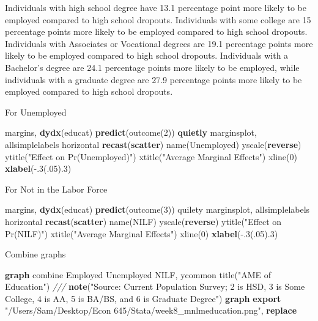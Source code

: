 \documentclass[
]{book}
\newenvironment{Shaded}{\begin{snugshade}}{\end{snugshade}}
\newcommand{\BaseNTok}[1]{\textcolor[rgb]{0.00,0.00,0.81}{#1}}
\newcommand{\CommentTok}[1]{\textcolor[rgb]{0.56,0.35,0.01}{\textit{#1}}}
\newcommand{\FunctionTok}[1]{\textcolor[rgb]{0.13,0.29,0.53}{\textbf{#1}}}
\newcommand{\KeywordTok}[1]{\textcolor[rgb]{0.13,0.29,0.53}{\textbf{#1}}}
\newcommand{\NormalTok}[1]{#1}
\newcommand{\StringTok}[1]{\textcolor[rgb]{0.31,0.60,0.02}{#1}}
\begin{document}
Individuals with high school degree have 13.1 percentage point more likely to be employed compared to high school dropouts. Individuals with some college are 15 percentage points more likely to be employed compared to high school dropouts. Individuals with Associates or Vocational degrees are 19.1 percentage points more likely to be employed compared to high school dropouts. Individuals with a Bachelor's degree are 24.1 percentage points more likely to be employed, while individuals with a graduate degree are 27.9 percentage points more likely to be employed compared to high school dropouts.

For Unemployed

\begin{Shaded}
\begin{Highlighting}[]
\NormalTok{margins, }\KeywordTok{dydx}\NormalTok{(educat) }\KeywordTok{predict}\NormalTok{(outcome(2))}
\KeywordTok{quietly}\NormalTok{ marginsplot, allsimplelabels horizontal }\KeywordTok{recast}\NormalTok{(}\KeywordTok{scatter}\NormalTok{) }\BaseNTok{name}\NormalTok{(Unemployed) }\BaseNTok{yscale}\NormalTok{(}\FunctionTok{reverse}\NormalTok{) }\BaseNTok{ytitle}\NormalTok{(}\StringTok{"Effect on Pr(Unemployed)"}\NormalTok{) }\BaseNTok{xtitle}\NormalTok{(}\StringTok{"Average Marginal Effects"}\NormalTok{) }\BaseNTok{xline}\NormalTok{(0) }\KeywordTok{xlabel}\NormalTok{({-}.3(.05).3)}
\end{Highlighting}
\end{Shaded}

For Not in the Labor Force

\begin{Shaded}
\begin{Highlighting}[]
\NormalTok{margins, }\KeywordTok{dydx}\NormalTok{(educat) }\KeywordTok{predict}\NormalTok{(outcome(3))}
\NormalTok{quilety marginsplot, allsimplelabels horizontal }\KeywordTok{recast}\NormalTok{(}\KeywordTok{scatter}\NormalTok{) }\BaseNTok{name}\NormalTok{(NILF) }\BaseNTok{yscale}\NormalTok{(}\FunctionTok{reverse}\NormalTok{) }\BaseNTok{ytitle}\NormalTok{(}\StringTok{"Effect on Pr(NILF)"}\NormalTok{) }\BaseNTok{xtitle}\NormalTok{(}\StringTok{"Average Marginal Effects"}\NormalTok{) }\BaseNTok{xline}\NormalTok{(0) }\KeywordTok{xlabel}\NormalTok{({-}.3(.05).3)}
\end{Highlighting}
\end{Shaded}

Combine graphs

\begin{Shaded}
\begin{Highlighting}[]
\KeywordTok{graph} \BaseNTok{combine}\NormalTok{ Employed Unemployed NILF, }\BaseNTok{ycommon} \BaseNTok{title}\NormalTok{(}\StringTok{"AME of Education"}\NormalTok{) }\CommentTok{///}
\KeywordTok{note}\NormalTok{(}\StringTok{"Source: Current Population Survey; 2 is HSD, 3 is Some College, 4 is AA, 5 is BA/BS, and 6 is Graduate Degree"}\NormalTok{)}
\KeywordTok{graph} \KeywordTok{export} \StringTok{"/Users/Sam/Desktop/Econ 645/Stata/week8\_mnlmeducation.png"}\NormalTok{, }\KeywordTok{replace}
\end{Highlighting}
\end{Shaded}
\end{document}
